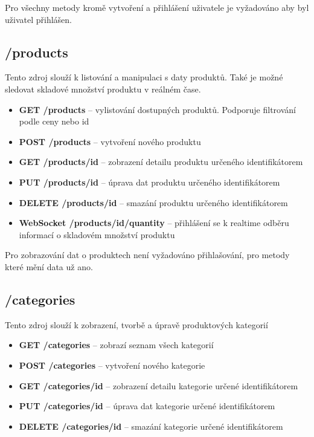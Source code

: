 \documentclass[thesis=M,czech]{FITthesis}[2019/12/23]
\begin{document}
Pro všechny metody kromě vytvoření a přihlášení uživatele je vyžadováno aby byl uživatel přihlášen.

\subsection{/products}
Tento zdroj slouží k listování a manipulaci s daty produktů. Také je možné sledovat skladové množství produktu v reálném čase.

\begin{itemize}
  \item \textbf{GET /products} -- vylistování dostupných produktů. Podporuje filtrování podle ceny nebo id
  \item \textbf{POST /products} -- vytvoření nového produktu
  \item \textbf{GET /products/{id}} -- zobrazení detailu produktu určeného identifikátorem
  \item \textbf{PUT /products/{id}} -- úprava dat produktu určeného identifikátorem
  \item \textbf{DELETE /products/{id}} -- smazání produktu určeného identifikátorem
  \item \textbf{WebSocket /products/{id}/quantity} -- přihlášení se k realtime odběru informací o skladovém množství produktu
\end{itemize}

Pro zobrazování dat o produktech není vyžadováno přihlašování, pro metody které mění data už ano.

\subsection{/categories}
Tento zdroj slouží k zobrazení, tvorbě a úpravě produktových kategorií

\begin{itemize}
  \item \textbf{GET /categories} -- zobrazí seznam všech kategorií
  \item \textbf{POST /categories} -- vytvoření nového kategorie
  \item \textbf{GET /categories/{id}} -- zobrazení detailu kategorie určené identifikátorem
  \item \textbf{PUT /categories/{id}} -- úprava dat kategorie určené identifikátorem
  \item \textbf{DELETE /categories/{id}} -- smazání kategorie určené identifikátorem
\end{itemize}
\end{document}
